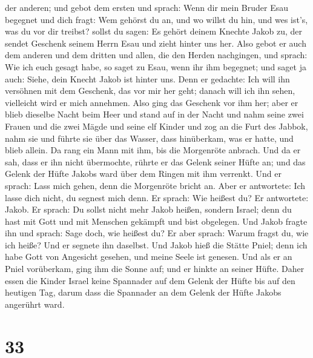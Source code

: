 der anderen;  und gebot dem ersten und sprach: Wenn dir
mein Bruder Esau begegnet und dich fragt: Wem gehörst du an, und wo
willst du hin, und wes ist's, was du vor dir treibst? 
sollst du sagen: Es gehört deinem Knechte Jakob zu, der sendet Geschenk
seinem Herrn Esau und zieht hinter uns her.  Also gebot
er auch dem anderen und dem dritten und allen, die den Herden
nachgingen, und sprach: Wie ich euch gesagt habe, so saget zu Esau, wenn
ihr ihm begegnet;  und saget ja auch: Siehe, dein Knecht
Jakob ist hinter uns. Denn er gedachte: Ich will ihn versöhnen mit dem
Geschenk, das vor mir her geht; danach will ich ihn sehen, vielleicht
wird er mich annehmen.  Also ging das Geschenk vor ihm
her; aber er blieb dieselbe Nacht beim Heer  und stand
auf in der Nacht und nahm seine zwei Frauen und die zwei Mägde und seine
elf Kinder und zog an die Furt des Jabbok,  nahm sie und
führte sie über das Wasser, dass hinüberkam, was er hatte,
 und blieb allein. Da rang ein Mann mit ihm, bis die
Morgenröte anbrach.  Und da er sah, dass er ihn nicht
übermochte, rührte er das Gelenk seiner Hüfte an; und das Gelenk der
Hüfte Jakobs ward über dem Ringen mit ihm verrenkt.  Und
er sprach: Lass mich gehen, denn die Morgenröte bricht an. Aber er
antwortete: Ich lasse dich nicht, du segnest mich denn. 
Er sprach: Wie heißest du? Er antwortete: Jakob.  Er
sprach: Du sollst nicht mehr Jakob heißen, sondern Israel; denn du hast
mit Gott und mit Menschen gekämpft und bist obgelegen. 
Und Jakob fragte ihn und sprach: Sage doch, wie heißest du? Er aber
sprach: Warum fragst du, wie ich heiße? Und er segnete ihn daselbst.
 Und Jakob hieß die Stätte Pniel; denn ich habe Gott von
Angesicht gesehen, und meine Seele ist genesen.  Und als
er an Pniel vorüberkam, ging ihm die Sonne auf; und er hinkte an seiner
Hüfte.  Daher essen die Kinder Israel keine Spannader auf
dem Gelenk der Hüfte bis auf den heutigen Tag, darum dass die Spannader
an dem Gelenk der Hüfte Jakobs angerührt ward.

\hypertarget{section-32}{%
\section{33}\label{section-32}}

